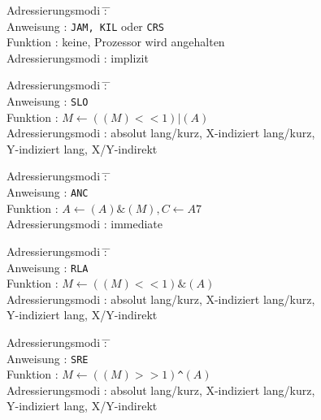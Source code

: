 \documentclass[12pt,a4paper,twoside]{report}
\newcommand{\tty}[1]{{\tt #1}}
\begin{document}
{\begin{tabbing}
Adressierungsmodi \= : \= \kill \\
Anweisung         \> : \> \tty{JAM, KIL} oder \tty{CRS} \\
Funktion          \> : \> keine, Prozessor wird angehalten \\
Adressierungsmodi \> : \> implizit \\
\end{tabbing}
\begin{tabbing}
Adressierungsmodi \= : \= \kill \\
Anweisung         \> : \> \tty{SLO} \\
Funktion          \> : \> $M\leftarrow((M)<<1)|(A)$ \\
Adressierungsmodi \> : \> absolut lang/kurz, X-indiziert lang/kurz, \\
                  \>   \> Y-indiziert lang, X/Y-indirekt \\
\end{tabbing}
\begin{tabbing}
Adressierungsmodi \= : \= \kill \\
Anweisung         \> : \> \tty{ANC} \\
Funktion          \> : \> $A\leftarrow(A)\&(M), C\leftarrow A7$ \\
Adressierungsmodi \> : \> immediate \\
\end{tabbing}
\begin{tabbing}
Adressierungsmodi \= : \= \kill \\
Anweisung         \> : \> \tty{RLA} \\
Funktion          \> : \> $M\leftarrow((M)<<1)\&(A)$ \\
Adressierungsmodi \> : \> absolut lang/kurz, X-indiziert lang/kurz, \\
                  \>   \> Y-indiziert lang, X/Y-indirekt \\
\end{tabbing}
\begin{tabbing}
Adressierungsmodi \= : \= \kill \\
Anweisung         \> : \> \tty{SRE} \\
Funktion          \> : \> $M\leftarrow((M)>>1)$\verb!^!$(A)$ \\
Adressierungsmodi \> : \> absolut lang/kurz, X-indiziert lang/kurz, \\
                  \>   \> Y-indiziert lang, X/Y-indirekt \\
\end{tabbing}
}
\end{document}
